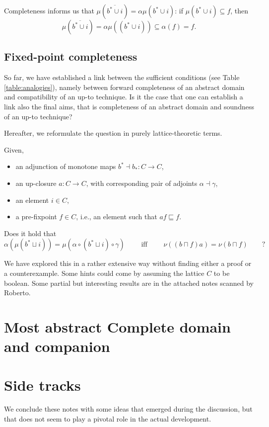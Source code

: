 \documentclass{llncs}
\begin{document}
Completeness informs us that $\mu  (\overline{b^*\cup i}) = \alpha  \mu (b^*\cup i)$: if $\mu (b^*\cup i) \subseteq f$, then $$\mu (\overline{b^*\cup i})  = \alpha \mu ((b^*\cup i)) \subseteq \alpha(f) = f\text{.}$$

\subsection{Fixed-point completeness}
So far, we have established a link between the sufficient conditions (see Table \ref{table:analogies}), namely between forward completeness of an abstract domain and compatibility of an up-to technique. Is it the case that one can establish a link also the final aims, that is completeness of an abstract domain and soundness of an up-to technique?

Hereafter, we reformulate the question in purely lattice-theoretic terms.

\medskip

Given, 
\begin{itemize}
\item an adjunction of monotone maps $b^*\dashv b_* \colon C\to C$,
\item an up-closure $a\colon C \to C$, with corresponding pair of adjoints $\alpha \dashv \gamma$,
\item an element $i\in C$,
\item a pre-fixpoint $f\in C$, i.e., an element such that $af \sqsubseteq f$.
\end{itemize}
Does it hold that
$$\alpha (\mu(b^* \sqcup i)) = \mu (\alpha \circ  (b^* \sqcup i) \circ \gamma ) \qquad  \text{ iff } \qquad \nu((b\sqcap f)a) = \nu( b \sqcap f) \qquad \text{?}$$


We have explored this in a rather extensive way without finding either a proof or a counterexample. Some hints could come by assuming the lattice $C$ to be boolean.
Some partial but interesting results are in the attached notes scanned by Roberto.


\section{Most abstract Complete domain and companion}
%


\section{Side tracks}
We conclude these notes with some ideas that emerged during the discussion, but that does not seem to play a pivotal role in the actual development.
\end{document}

